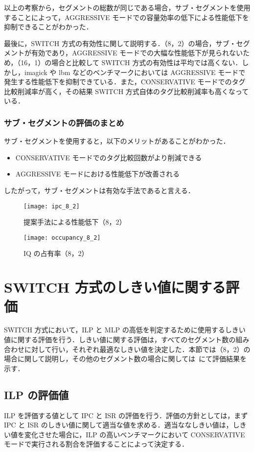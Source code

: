 以上の考察から，セグメントの総数が同じである場合，サブ・セグメントを使用することによって，AGGRESSIVE モードでの容量効率の低下による性能低下を抑制できることがわかった．

最後に，SWITCH 方式の有効性に関して説明する．（8，2）の場合，サブ・セグメントが有効であり，AGGRESSIVE モードでの大幅な性能低下が見られないため，（16，1）の場合と比較して SWITCH 方式の有効性は平均では高くない．しかし，imagick や lbm などのベンチマークにおいては AGGRESSIVE モードで発生する性能低下を抑制できている．また，CONSERVATIVE モードでのタグ比較削減率が高く，その結果 SWITCH 方式自体のタグ比較削減率も高くなっている．

\subsubsection{サブ・セグメントの評価のまとめ}
サブ・セグメントを使用すると，以下のメリットがあることがわかった．
\begin{itemize}
  \item CONSERVATIVE モードでのタグ比較回数がより削減できる
  \item AGGRESSIVE モードにおける性能低下が改善される
\end{itemize}
したがって，サブ・セグメントは有効な手法であると言える．

\begin{figure}[htb]
  \centering
  \texttt{[image: ipc\_8\_2]}
  \caption{提案手法による性能低下（8，2）}
  \label{fig:ipc_8_2}
\end{figure}

\begin{figure}[htb]
  \centering
  \texttt{[image: occupancy\_8\_2]}
  \caption{IQ の占有率（8，2）}
  \label{fig:occupancy_8_2}
\end{figure}

\clearpage

\section{SWITCH 方式のしきい値に関する評価}
\label{sec:eval_threshold}
SWITCH 方式において，ILP と MLP の高低を判定するために使用するしきい値に関する評価を行う．しきい値に関する評価は，すべてのセグメント数の組み合わせに対して行い，それぞれ最適なしきい値を決定した．本節では（8，2）の場合に関して説明し，その他のセグメント数の場合に関しては~にて評価結果を示す．

\subsection{ILP の評価値}
ILP を評価する値として IPC と ISR の評価を行う．評価の方針としては，まず IPC と ISR のしきい値に関して適当な値を求める．適当ななしきい値は，しきい値を変化させた場合に，ILP の高いベンチマークにおいて CONSERVATIVE モードで実行される割合を評価することによって決定する．

